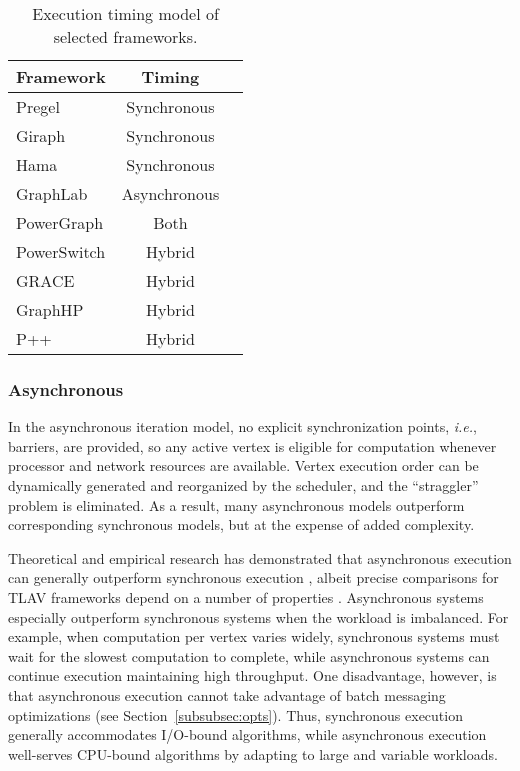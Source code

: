 \documentclass[reprint,twocolumn,showpacs,preprintnumbers,amsmath, aps,pre,amssymb]{revtex4-1}
\begin{document}
\begin{table}[t]
\centering
\small{
\begin{tabular} {l | c l}
Framework & Timing & \\ \hline
Pregel      &   Synchronous & \cite{Malewicz2010} \\
Giraph      & Synchronous   & \cite{Avery2011} \\
Hama        & Synchronous   & \cite{Seo2010} \\
GraphLab    & Asynchronous  & \cite{Low2012,Low2010} \\
PowerGraph  & Both          & \cite{Gonzalez2012} \\ 
PowerSwitch & Hybrid        & \cite{Xie2013} \\
GRACE       & Hybrid        & \cite{Wang2013} \\
GraphHP     & Hybrid        & \cite{Chen} \\
P++         & Hybrid        & \cite{Zhou2014}
\end{tabular}
}
\caption{Execution timing model of selected frameworks.}
\label{table:timing}
\end{table}

\subsubsection{Asynchronous}
\label{subsubsec:async}
In the asynchronous iteration model, no explicit synchronization points, {\em i.e.}, barriers, are provided, so any active vertex is eligible for computation whenever processor and network resources are available.  Vertex execution order can be dynamically generated and reorganized by the scheduler, and the ``straggler'' problem is eliminated. As a result, many asynchronous  models outperform corresponding synchronous models, but at the expense of added complexity.

Theoretical and empirical research has demonstrated that asynchronous execution can generally outperform synchronous execution \cite{Bertsekas1989,Low2012}, albeit precise comparisons for TLAV frameworks depend on a number of properties \cite{Xie2013}.  Asynchronous systems especially outperform synchronous systems when the workload is imbalanced. For example, when computation per vertex varies widely, synchronous systems must wait for the slowest computation to complete, while asynchronous systems can continue execution maintaining high throughput. One disadvantage, however, is that asynchronous execution cannot take advantage of batch messaging optimizations (see Section~\ref{subsubsec:opts}). Thus, synchronous execution generally accommodates I/O-bound algorithms, while asynchronous execution well-serves CPU-bound algorithms by adapting to large and variable workloads.
\end{document}
